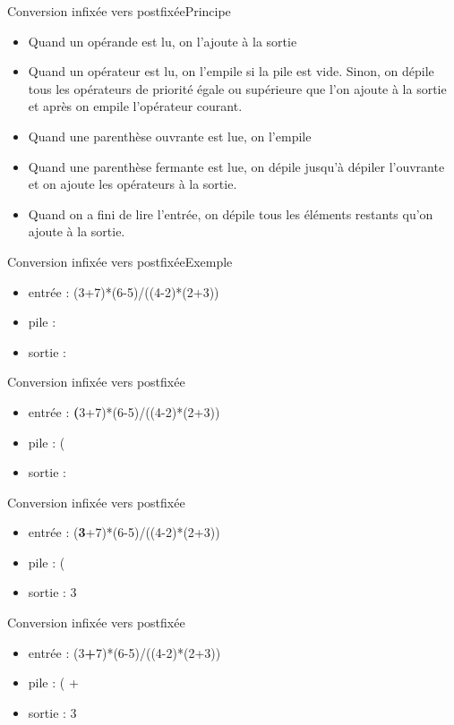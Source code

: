 \documentclass[12pt,a4paper]{beamer}
\begin{document}
\begin{frame}{Conversion infixée vers postfixée}{Principe}

\begin{itemize}
\item Quand un opérande est lu, on l'ajoute à la sortie
\item Quand un opérateur est lu, on l'empile si la pile est vide. Sinon, on dépile tous les opérateurs de priorité égale ou supérieure que l'on ajoute à la sortie et après on empile l'opérateur courant.
\item Quand une parenthèse ouvrante est lue, on l'empile
\item Quand une parenthèse fermante est lue, on dépile jusqu'à dépiler l'ouvrante et on ajoute les opérateurs à la sortie.
\item Quand on a fini de lire l'entrée, on dépile tous les éléments restants qu'on ajoute à la sortie.
\end{itemize}
\end{frame}

\begin{frame}{Conversion infixée vers postfixée}{Exemple}
\begin{itemize}
\item entrée : (3+7)*(6-5)/((4-2)*(2+3))
\item pile : 
\item sortie : 
\end{itemize}
\end{frame}

\begin{frame}{Conversion infixée vers postfixée}
\begin{itemize}
\item entrée : \textbf{(}3+7)*(6-5)/((4-2)*(2+3))
\item pile : (
\item sortie : 
\end{itemize}
\end{frame}

\begin{frame}{Conversion infixée vers postfixée}
\begin{itemize}
\item entrée : (\textbf{3}+7)*(6-5)/((4-2)*(2+3))
\item pile : (
\item sortie : 3
\end{itemize}
\end{frame}

\begin{frame}{Conversion infixée vers postfixée}
\begin{itemize}
\item entrée : (3\textbf{+}7)*(6-5)/((4-2)*(2+3))
\item pile : ( + 
\item sortie : 3
\end{itemize}
\end{frame}
\end{document}
